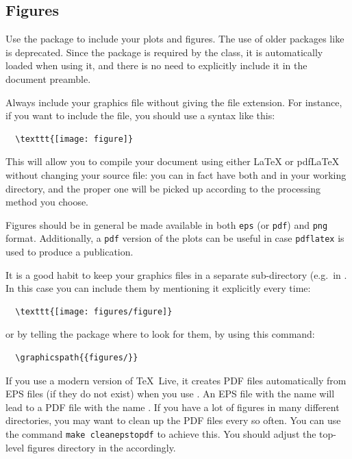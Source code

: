 \subsection{Figures}

Use the  package to include your plots and figures. 
The use of older packages like  is deprecated.
Since the  package is required by the 
class, it is automatically loaded when using it, and there is no need
to explicitly include it in the document preamble.

Always include your graphics file without giving the file extension.
For instance, if you want to include the 
file, you should use a syntax like this:
\begin{verbatim}
  \texttt{[image: figure]}
\end{verbatim}
This will allow you to compile your document using either \LaTeX{} or
pdf\LaTeX{} without changing your source file: you can in fact have
both  and  in your working directory,
and the proper one will be picked up according to the processing method
you choose.

Figures should be in general be made available in both \texttt{eps} (or \texttt{pdf}) and 
\texttt{png} format. Additionally, a \texttt{pdf} version of the plots can be
useful in case \verb|pdflatex| is used to produce a publication.

It is a good habit to keep your graphics files in a separate
sub-directory (e.g.\ in . 
In this case you can include them by mentioning it explicitly every time:
\begin{verbatim}
  \texttt{[image: figures/figure]}
\end{verbatim}
or by telling the  package where to look
for them, by using this command:
\begin{verbatim}
  \graphicspath{{figures/}}
\end{verbatim}

If you use a modern version of \TeX\ Live, it creates PDF files automatically from EPS files
(if they do not exist) when you use .
An EPS file with the name  will lead to a PDF file with the name
.
If you have a lot of figures in many different directories, you may want to clean up the PDF files every so often.
You can use the command \verb|make cleanepstopdf| to achieve this.
You should adjust the top-level figures directory in the  accordingly.


